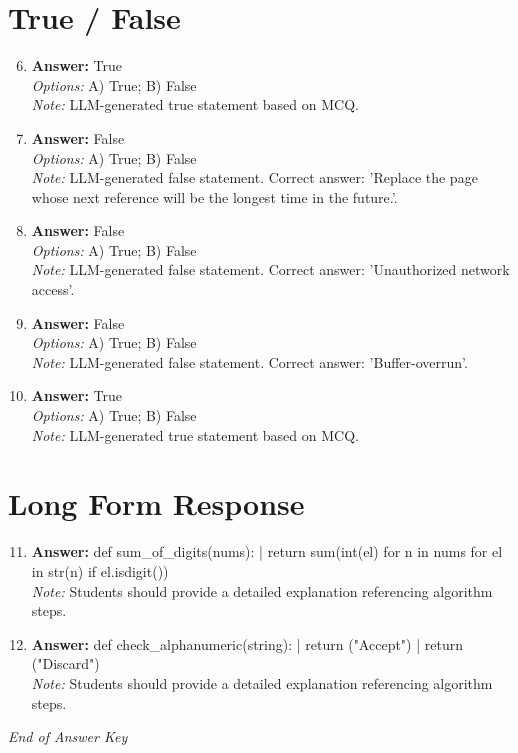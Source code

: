 \documentclass[12pt]{article}
\begin{document}
\section*{True / False}
\begin{enumerate}[label=\arabic*.]
\setcounter{enumi}{5}
\item \textbf{Answer:} True
\\ \textit{Options:} A) True; B) False
\\ \textit{Note:} LLM-generated true statement based on MCQ.
\item \textbf{Answer:} False
\\ \textit{Options:} A) True; B) False
\\ \textit{Note:} LLM-generated false statement. Correct answer: 'Replace the page whose next reference will be the longest time in the future.'.
\item \textbf{Answer:} False
\\ \textit{Options:} A) True; B) False
\\ \textit{Note:} LLM-generated false statement. Correct answer: 'Unauthorized network access'.
\item \textbf{Answer:} False
\\ \textit{Options:} A) True; B) False
\\ \textit{Note:} LLM-generated false statement. Correct answer: 'Buffer-overrun'.
\item \textbf{Answer:} True
\\ \textit{Options:} A) True; B) False
\\ \textit{Note:} LLM-generated true statement based on MCQ.
\end{enumerate}

\section*{Long Form Response}
\begin{enumerate}[label=\arabic*.]
\setcounter{enumi}{10}
\item \textbf{Answer:} def sum\_of\_digits(nums): | return sum(int(el) for n in nums for el in str(n) if el.isdigit())
\\ \textit{Note:} Students should provide a detailed explanation referencing algorithm steps.
\item \textbf{Answer:} def check\_alphanumeric(string): | return ("Accept") | return ("Discard")
\\ \textit{Note:} Students should provide a detailed explanation referencing algorithm steps.
\end{enumerate}

\vfill
\noindent\textit{End of Answer Key}
\end{document}
